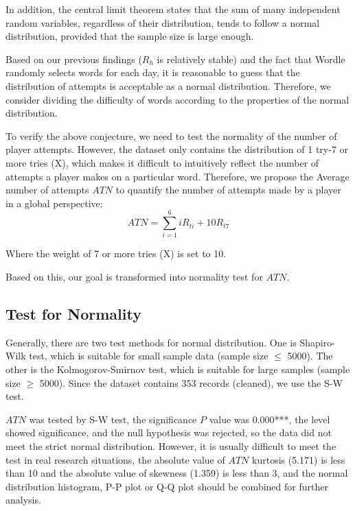 \documentclass[12pt]{article}  %
\begin{document}
In addition, the central limit theorem states that the sum of many independent random variables, regardless of their distribution, tends to follow a normal distribution, provided that the sample size is large enough.

Based on our previous findings ($R_h$ is relatively stable) and the fact that Wordle randomly selects words for each day, it is reasonable to guess that the distribution of attempts is acceptable as a normal distribution. Therefore, we consider dividing the difficulty of words according to the properties of the normal distribution.

To verify the above conjecture, we need to test the normality of the number of player attempts. However, the dataset only contains the distribution of 1 try-7 or more tries (X), which makes it difficult to intuitively reflect the number of attempts a player makes on a particular word.
Therefore, we propose the Average number of attempts $ATN$ to quantify the number of attempts made by a player in a global perspective:
\begin{equation}\label{eq:ATN}
    ATN=\sum_{i=1}^{6} iR_{ti}+10R_{t7}
\end{equation}

Where the weight of 7 or more tries (X) is set to 10. 

Based on this, our goal is transformed into normality test for $ATN$.

\clearpage

\subsection{Test for Normality}
Generally, there are two test methods for normal distribution. One is Shapiro-Wilk test, which is suitable for small sample data (sample size $\leq$ 5000). The other is the Kolmogorov-Smirnov test, which is suitable for large samples (sample size $\geq$ 5000). Since the dataset contains 353 records (cleaned), we use the S-W test.



$ATN$ was tested by S-W test, the significance $P$ value was 0.000***, the level showed significance, and the null hypothesis was rejected, so the data did not meet the strict normal distribution. However, it is usually difficult to meet the test in real research situations, the absolute value of $ATN$ kurtosis (5.171) is less than 10 and the absolute value of skewness (1.359) is less than 3, and the normal distribution histogram, P-P plot or Q-Q plot should be combined for further analysis.
\end{document}
